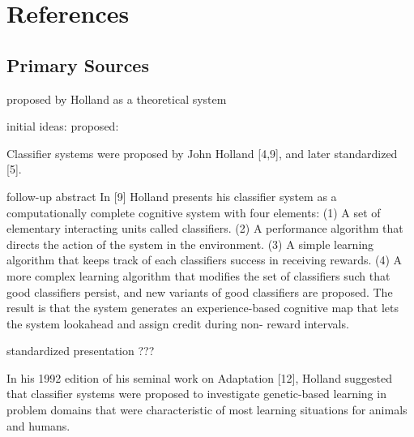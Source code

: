 \documentclass[a4paper, 11pt]{article}
\begin{document}



\section{References}
\label{sec:references}

% 
% 
\subsection{Primary Sources}

proposed by Holland as a theoretical system

initial ideas:
proposed: \cite{Holland1976}


Classifier systems were proposed by John Holland [4,9], and later standardized [5]. 

follow-up abstract \cite{Holland1977}
In [9] Holland presents his classifier system as a computationally complete cognitive system with four elements: (1) A set of elementary interacting units called classifiers. (2) A performance algorithm that directs the action of the system in the environment. (3) A simple learning algorithm that keeps track of each classifiers success in receiving rewards. (4) A more complex learning algorithm that modifies the set of classifiers such that good classifiers persist, and new variants of good classifiers are proposed. The result is that the system generates an experience-based cognitive map that lets the system lookahead and assign credit during non-
reward intervals.

standardized presentation \cite{Holland1980}
???

In his 1992 edition of his seminal work on Adaptation [12], Holland suggested that classifier systems were proposed to investigate genetic-based learning in problem domains that were characteristic of most learning situations for animals and humans.
\end{document}
